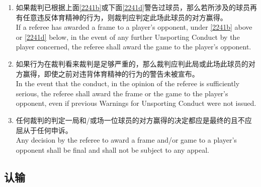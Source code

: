 \begin{enumerate}[label=(\alph*)]
    \item \label{2241c}如果裁判已根据上面\ref{2241b}或下面\ref{2241d}警告过球员，那么若所涉及的球员再有任意违反体育精神的行为，则裁判应判定此场此球员的对方赢得。\\
    If a referee has awarded a frame to a player's opponent, under \ref{2241b} above or \ref{2241d} below, in the event of any further Unsporting Conduct by the player concerned, the referee shall award the game to the player's opponent.
    \item \label{2241d}如果行为在裁判看来裁判是足够严重的，那么裁判应判此局或此场此球员的对方赢得，即使之前对违背体育精神的行为的警告未被宣布。\\
    In the event that the conduct, in the opinion of the referee is sufficiently serious, the referee shall award the frame or the game to the player's opponent, even if previous Warnings for Unsporting Conduct were not issued.
    \item 任何裁判的判定一局和/或场一位球员的对方赢得的决定都应是最终的且不应屈从于任何申诉。 \\
    Any decision by the referee to award a frame and/or game to a player's opponent shall be final and shall not be subject to any appeal.
\end{enumerate}

\subsection{认输}\label{2242}


